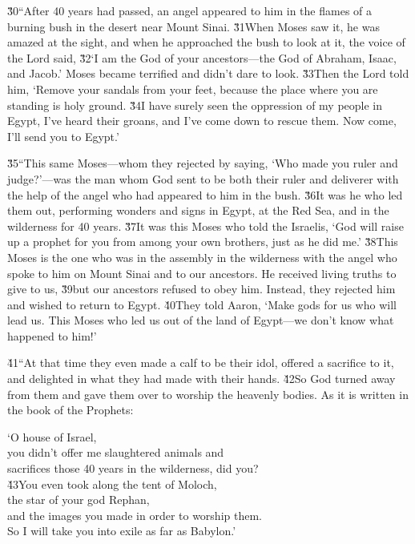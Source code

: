 \v{30}``After 40 years had passed, an angel appeared to him in the flames of a burning bush in the desert near Mount Sinai. \v{31}When Moses saw it, he was amazed at the sight, and when he approached the bush to look at it, the voice of the Lord said, \v{32}`I am the God of your ancestors---the God of Abraham, Isaac, and Jacob.' Moses became terrified and didn't dare to look. \v{33}Then the Lord told him, `Remove your sandals from your feet, because the place where you are standing is holy ground. \v{34}I have surely seen the oppression of my people in Egypt, I've heard their groans, and I've come down to rescue them. Now come, I'll send you to Egypt.'

\v{35}``This same Moses---whom they rejected by saying, `Who made you ruler and judge?'---was the man whom God sent to be both their ruler and deliverer with the help of the angel who had appeared to him in the bush. \v{36}It was he who led them out, performing wonders and signs in Egypt, at the Red Sea, and in the wilderness for 40 years. \v{37}It was this Moses who told the Israelis, `God will raise up a prophet for you from among your own brothers, just as he did me.' \v{38}This Moses is the one who was in the assembly in the wilderness with the angel who spoke to him on Mount Sinai and to our ancestors. He received living truths to give to us, \v{39}but our ancestors refused to obey him. Instead, they rejected him and wished to return to Egypt. \v{40}They told Aaron, `Make gods for us who will lead us. This Moses who led us out of the land of Egypt---we don't know what happened to him!'

\v{41}``At that time they even made a calf to be their idol, offered a sacrifice to it, and delighted in what they had made with their hands. \v{42}So God turned away from them and gave them over to worship the heavenly bodies. As it is written in the book of the Prophets:

\begin{poetry}
\poeml `O house of Israel, \\
\poemll    you didn't offer me slaughtered animals and \\
\poemlll       sacrifices those 40 years in the wilderness, did you? \\
\poeml \v{43}You even took along the tent of Moloch, \\
\poemll    the star of your god Rephan, \\
\poeml and the images you made in order to worship them. \\
\poemll    So I will take you into exile as far as Babylon.'
\end{poetry}

